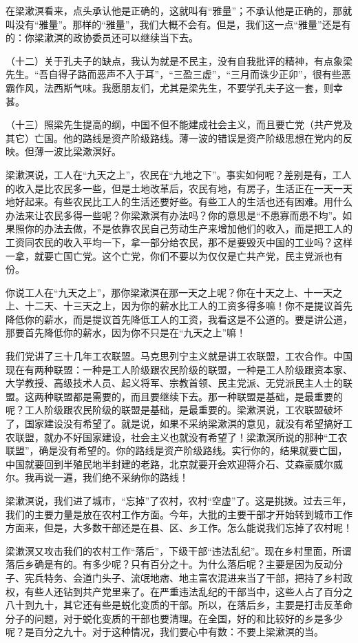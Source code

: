 在梁漱溟看来，点头承认他是正确的，这就叫有“雅量”；不承认他是正确的，那就叫没有“雅量”。那样的“雅量”，我们大概不会有。但是，我们这一点“雅量”还是有的：你梁漱溟的政协委员还可以继续当下去。

（十二）关于孔夫子的缺点，我认为就是不民主，没有自我批评的精神，有点象梁先生。“吾自得子路而恶声不入于耳”，“三盈三虚”，“三月而诛少正卯”，很有些恶霸作风，法西斯气味。我愿朋友们，尤其是梁先生，不要学孔夫子这一套，则幸甚。

（十三）照梁先生提高的纲，中国不但不能建成社会主义，而且要亡党（共产党及其它）亡国。他的路线是资产阶级路线。薄一波的错误是资产阶级思想在党内的反映。但薄一波比梁漱溟好。

梁漱溟说，工人在“九天之上”，农民在“九地之下”。事实如何呢？差别是有，工人的收入是比农民多一些，但是土地改革后，农民有地，有房子，生活正在一天一天地好起来。有些农民比工人的生活还要好些。有些工人的生活也还有困难。用什么办法来让农民多得一些呢？你梁漱溟有办法吗？你的意思是“不患寡而患不均”。如果照你的办法去做，不是依靠农民自己劳动生产来增加他们的收入，而是把工人的工资同农民的收入平均一下，拿一部分给农民，那不是要毁灭中国的工业吗？这样一拿，就要亡国亡党。这个亡党，你们不要以为仅仅是亡共产党，民主党派也有份。

你说工人在“九天之上”，那你梁漱溟在那一天之上呢？你在十天之上、十一天之上、十二天、十三天之上，因为你的薪水比工人的工资多得多嘛！你不是提议首先降低你的薪水，而是提议首先降低工人的工资，我看这是不公道的。要是讲公道，那要首先降低你的薪水，因为你不只是在“九天之上”嘛！

我们党讲了三十几年工农联盟。马克思列宁主义就是讲工农联盟，工农合作。中国现在有两种联盟：一种是工人阶级跟农民阶级的联盟，一种是工人阶级跟资本家、大学教授、高级技术人员、起义将军、宗教首领、民主党派、无党派民主人士的联盟。这两种联盟都是需要的，而且要继续下去。那一种联盟是基础，是最重要的呢？工人阶级跟农民阶级的联盟是基础，是最重要的。梁漱溟说，工农联盟破坏了，国家建设没有希望了。就是说，如果不采纳梁漱溟的意见，就没有希望搞好工农联盟，就办不好国家建设，社会主义也就没有希望了！梁漱溟所说的那种“工农联盟”，确是没有希望的。你的路线是资产阶级路线。实行你的，结果就要亡国，中国就要回到半殖民地半封建的老路，北京就要开会欢迎蒋介石、艾森豪威尔威尔。我再说一遍，我们绝不采纳你的路线！

梁漱溟说，我们进了城市，“忘掉”了农村，农村“空虚”了。这是挑拨。过去三年，我们的主要力量是放在农村工作方面。今年，大批的主要干部才开始转到城市工作方面来，但是，大多数干部还是在县、区、乡工作。怎么能说我们忘掉了农村呢！

梁漱溟又攻击我们的农村工作“落后”，下级干部“违法乱纪”。现在乡村里面，所谓落后乡确是有的。有多少呢？只有百分之十。为什么落后呢？主要是因为反动分子、宪兵特务、会道门头子、流氓地痞、地主富农混进来当了干部，把持了乡村政权，有些人还钻到共产党里来了。在严重违法乱纪的干部当中，这些人占了百分之八十到九十，其它还有些是蜕化变质的干部。所以，在落后乡，主要是打击反革命分子的问题，对于蜕化变质的干部也要清理。在全国，好的和比较好的乡是多少呢？是百分之九十。对于这种情况，我们要心中有数：不要上梁漱溟的当。

